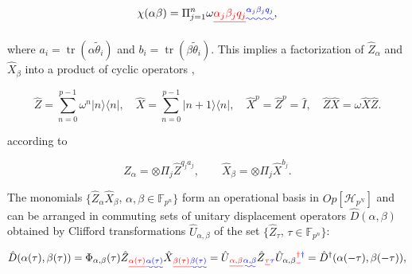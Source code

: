 \documentclass[quantumrep,article,submit,pdftex,moreauthors]{Definitions/mdpi}
\DeclareMathOperator{\tr}{tr}
\providecommand{\DIFadd}[1]{{\protect\color{blue}\uwave{#1}}} %
\providecommand{\DIFdel}[1]{{\protect\color{red}\sout{#1}}}                      %
\providecommand{\DIFaddbegin}{} %
\providecommand{\DIFaddend}{} %
\providecommand{\DIFdelbegin}{} %
\providecommand{\DIFdelend}{} %
\begin{document}
\begin{equation}
  \chi\left( \alpha \beta \right)
  = \Pi_{j=1}^{n} \omega\DIFdelbegin %
\DIFdel{\alpha_{j}\beta _{j}q_{j}}%
\DIFdelend \DIFaddbegin \DIFadd{^{\alpha_{j}\beta_{j}q_{j}}}\DIFaddend ,
  \label{chi fact}
\end{equation}

where $a_{i} = \tr(\alpha \tilde{\theta}_{i})$ and $b_{i} = \tr(\beta
\tilde{\theta }_{i})$. This implies a factorization of $\hat{Z}_{\alpha}$ and
$\hat{X}_{\beta }$ into a product of cyclic operators
\cite{Schwinger1,Schwinger2},

\begin{equation}
  \hat{Z}
  = \sum_{n=0}^{p-1} \omega^{n} |n\rangle \langle n|, \quad \hat{X}
  = \sum_{n=0}^{p-1} |n+1\rangle \langle n|,
  \quad \hat{X}^{p} = \hat{Z}^{p} = \hat{I},
  \quad \hat{Z}\hat{X} = \omega \hat{X}\hat{Z}.
\end{equation}

according to

\begin{equation}
  \hat{Z}_{\alpha }
  = \otimes \Pi_{j}\hat{Z}^{q_{j}a_{j}},
  \qquad \hat{X}_{\beta} = \otimes \Pi _{j}\hat{X}^{b_{j}}.
  \label{ZXq}
\end{equation}

The monomials $\{\hat{Z}_{\alpha }\hat{X}_{\beta }$, $\alpha ,\beta \in
\mathbb{F}_{p^{n}}\}$ form an operational basis in $Op[\mathcal{H}_{p^{N}}]$ and
can be arranged in commuting sets of unitary displacement operators
\DIFdelbegin \DIFdel{$
\hat{D}(\alpha,\beta)$ }\DIFdelend \DIFaddbegin \DIFadd{$\hat{D}(\alpha,\beta)$ }\DIFaddend obtained by Clifford transformations
$\hat{U}_{\alpha,\beta}$ of the set $\{\hat{Z}_{\tau}$, \DIFdelbegin \DIFdel{$\tau \in \mathbb{F}
_{p^{n}}\}$}\DIFdelend \DIFaddbegin \DIFadd{$\tau \in
\mathbb{F}_{p^{n}}\}$}\DIFaddend :

\begin{equation}
  \hat{D} \left( \alpha (\tau ),\beta (\tau )\right)
  = \Phi_{\alpha,\beta} \left( \tau \right)
  \hat{Z}\DIFdelbegin \DIFdel{_{\alpha (\tau )}}\DIFdelend \DIFaddbegin \DIFadd{_{\alpha (\tau)}}\DIFaddend \hat{X}\DIFdelbegin \DIFdel{_{\beta (\tau )}
  }\DIFdelend \DIFaddbegin \DIFadd{_{\beta(\tau)}
  }\DIFaddend = \hat{U}\DIFdelbegin \DIFdel{_{\alpha,\beta }}\DIFdelend \DIFaddbegin \DIFadd{_{\alpha,\beta}}\DIFaddend \hat{Z}\DIFdelbegin \DIFdel{_{\tau }}\DIFdelend \DIFaddbegin \DIFadd{_{\tau}}\DIFaddend \hat{U}_{\alpha,\beta }\DIFdelbegin \DIFdel{^{\dagger }
  }\DIFdelend \DIFaddbegin \DIFadd{^{\dagger}
  }\DIFaddend = \hat{D}^{\dagger }\left(\alpha (-\tau),\beta (-\tau )\right),
  \label{D}
\end{equation}
\end{document}
